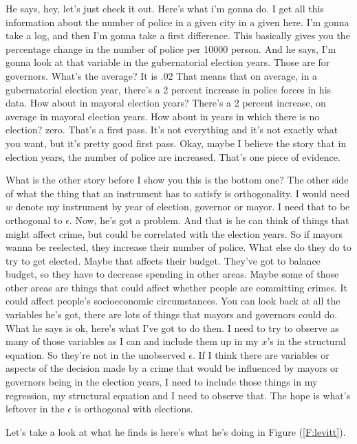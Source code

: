 \documentclass[11pt,a4paper]{amsart}
\theoremstyle{plain}
\theoremstyle{definition}
\begin{document}
 		  He says, hey, let's just check it out. Here's what i'm gonna do. I get all this information about the number of police in a given city in a given here. I'm gonna take a log, and then I'm gonna take a first difference.  This basically gives you the  percentage change in the number of police per 10000 person. And he says, I'm gonna look at that variable in the gubernatorial election years. Those are for governors. What's the average?  It is .02 That means that on average, in a gubernatorial election year, there's a 2 percent increase in police forces in his data. How about in mayoral election years? There's a 2 percent increase, on average in mayoral election years. How about in years in which there is no election? zero. That's a first pass. It's not everything and it's not exactly what you want, but it's pretty good first pass. Okay, maybe I believe the story that in election years, the number of police are increased. That's one piece of evidence.\par 
 		  What is the other story before I show you this is the bottom one? The other side of what the thing that an instrument has to satisfy is orthogonality. I would need $w$ denote my instrument by year of election, governor or mayor. I need that to be orthogonal to $\epsilon$. Now, he's got a problem. And that is he can think of things that might affect crime, but could be correlated with the election years. So if mayors wanna be reelected, they increase their number of police. What else do they do to try to get elected. Maybe that affects their budget. They've got to balance budget, so they have to decrease spending in other areas.  Maybe some of those other areas are things that could affect whether people are committing crimes.  It could affect people's socioeconomic circumstances.  You can look back at all the variables he's got, there are lots of things that mayors and governors could do. What he says is ok, here's what I've got to do then.  I need to try to observe as many of those variables as I can and include them up in my $x$'s in the structural equation. So they're not in the unobserved $\epsilon$.  If I think there are variables or aspects of the decision made by a crime that would be influenced by mayors or governors being in the election years, I need to include those things in my regression, my structural equation and I need to observe that. The hope is  what's leftover in the $\epsilon$ is orthogonal with elections.\par 
 		  Let's take a look at what he finds is here's what he's doing in Figure (\ref{F:levitt}). 
\end{document}
